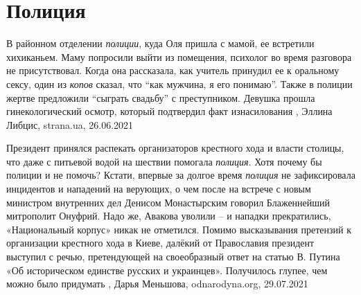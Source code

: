  
 
 
 
 
\chapter{Полиция}
\label{sec:slova.policia}

В районном отделении \emph{полиции}, куда Оля пришла с мамой, ее встретили хихиканьем.
Маму попросили выйти из помещения, психолог во время разговора не
присутствовал. Когда она рассказала, как учитель принудил ее к оральному сексу,
один из \emph{копов} сказал, что \enquote{как мужчина, я его понимаю}. Также в полиции жертве
предложили \enquote{сыграть свадьбу} с преступником.  Девушка прошла гинекологический
осмотр, который подтвердил факт изнасилования
, Эллина Либцис, strana.ua, 26.06.2021

Президент принялся распекать организаторов крестного хода и власти столицы, что
даже с питьевой водой на шествии помогала \emph{полиция}. Хотя почему бы полиции и не
помочь?  Кстати, впервые за долгое время \emph{полиция} не зафиксировала инцидентов и
нападений на верующих, о чем после на встрече с новым министром внутренних дел
Денисом Монастырским говорил Блаженнейший митрополит Онуфрий. Надо же, Авакова
уволили – и нападки прекратились, «Национальный корпус» никак не отметился.
Помимо высказывания претензий к организации крестного хода в Киеве, далёкий от
Православия президент выступил с речью, претендующей на своеобразный ответ на
статью В. Путина «Об историческом единстве русских и украинцев».  Получилось
глупее, чем можно было придумать
, 
Дарья Меньшова, odnarodyna.org, 29.07.2021
